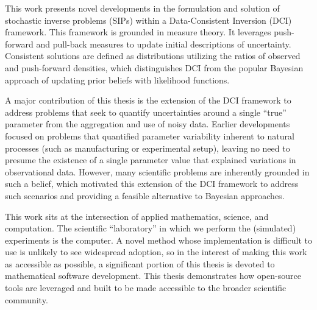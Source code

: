 \setlength{\parindent}{0.5in}
This work presents novel developments in the formulation and solution of stochastic inverse problems (SIPs) within a Data-Consistent Inversion (DCI) framework.
This framework is grounded in measure theory.
It leverages push-forward and pull-back measures to update initial descriptions of uncertainty.
Consistent solutions are defined as distributions utilizing the ratios of observed and push-forward densities, which distinguishes DCI from the popular Bayesian approach of updating prior beliefs with likelihood functions.

A major contribution of this thesis is the extension of the DCI framework to address problems that seek to quantify uncertainties around a single ``true'' parameter from the aggregation and use of noisy data.
Earlier developments focused on problems that quantified parameter variability inherent to natural processes (such as manufacturing or experimental setup), leaving no need to presume the existence of a single parameter value that explained variations in observational data.
However, many scientific problems are inherently grounded in such a belief, which motivated this extension of the DCI framework to address such scenarios and providing a feasible alternative to Bayesian approaches.

This work sits at the intersection of applied mathematics, science, and computation.
The scientific ``laboratory'' in which we perform the (simulated) experiments is the computer.
A novel method whose implementation is difficult to use is unlikely to see widespread adoption, so in the interest of making this work as accessible as possible, a significant portion of this thesis is devoted to mathematical software development.
This thesis demonstrates how open-source tools are leveraged and built to be made accessible to the broader scientific community.

\vfill
